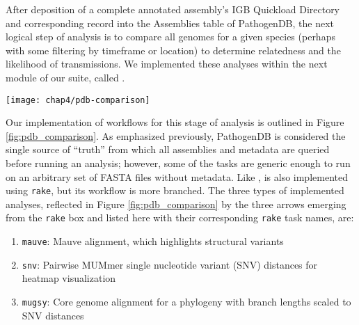 After deposition of a complete annotated assembly's IGB Quickload Directory and corresponding record into the Assemblies table of PathogenDB, the next logical step of analysis is to compare all genomes for a given species (perhaps with some filtering by timeframe or location) to determine relatedness and the likelihood of transmissions. We implemented these analyses within the next module of our suite, called \pathogendbcomparison.

\begin{figure*}[htb]
  \centering
  \texttt{[image: chap4/pdb-comparison]}               
  \caption[Outline of steps automated by \pathogendbcomparison]{\textbf{Outline of steps automated by \pathogendbcomparison.} Processes are depicted as boxes, with processes requiring potentially multiple runs indicated as a ``stack.'' An interim file format is depicted as a single arrow, and groups of files as doubled arrows. The pipeline concludes with various outputs being sent to \pathogendbviz for further visualization.}
  \label{fig:pdb_comparison}
\end{figure*}

Our implementation of workflows for this stage of analysis is outlined in Figure \ref{fig:pdb_comparison}. As emphasized previously, PathogenDB is considered the single source of ``truth'' from which all assemblies and metadata are queried before running an analysis; however, some of the tasks are generic enough to run on an arbitrary set of FASTA files without metadata. Like \pathogendbpipeline, \pathogendbcomparison{} is also implemented using \texttt{rake}, but its workflow is more branched. The three types of implemented analyses, reflected in Figure \ref{fig:pdb_comparison} by the three arrows emerging from the \texttt{rake} box and listed here with their corresponding \texttt{rake} task names, are:

\begin{enumerate}[label=\arabic*.,noitemsep,labelindent=2em,leftmargin=!]
\item \verb|mauve|: Mauve alignment, which highlights structural variants
\item \verb|snv|: Pairwise MUMmer single nucleotide variant (SNV) distances for heatmap visualization
\item \verb|mugsy|: Core genome alignment for a phylogeny with branch lengths scaled to SNV distances
\end{enumerate}

